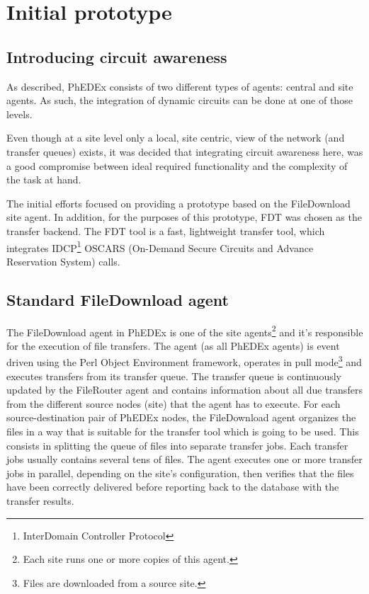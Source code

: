 \section{Initial prototype}

\subsection{Introducing circuit awareness}

As described, PhEDEx consists of two different types of agents: 
central and site agents. As such, the integration of dynamic circuits can 
be done at one of those levels.

Even though at a site level only a local, site centric, view of
the network (and transfer queues) exists, it was decided that integrating 
circuit awareness here, was a good compromise between ideal required 
functionality and the complexity of the task at hand.

The initial efforts\cite{ANSE-ISGC} focused on providing a prototype based on the FileDownload
site agent. In addition, for the purposes of this prototype, FDT\cite{FDT} was chosen
as the transfer backend. The FDT tool is a fast, lightweight transfer tool,
which integrates IDCP\footnote{InterDomain Controller Protocol} \cite{IDCP}
OSCARS\cite{OSCARS} (On-Demand Secure Circuits and Advance Reservation System) calls.

\subsection{Standard FileDownload agent}

The FileDownload agent in PhEDEx is one of the site agents\footnote{
Each site runs one or more copies of this agent.} and it's responsible for the
execution of file transfers. The agent (as all PhEDEx agents) is event driven 
using the Perl Object Environment framework, operates in pull mode\footnote{Files are
downloaded from a source site.} and executes transfers from its transfer queue.
The transfer queue is continuously updated by the FileRouter agent and contains 
information about all due transfers from the different source nodes (site) that the agent 
has to execute. For each source-destination pair of PhEDEx nodes, the FileDownload 
agent organizes the files in a way that is suitable for the transfer tool which is 
going to be used. This consists in splitting the queue of files into separate 
transfer jobs. Each transfer jobs usually contains several tens of files.
The agent executes one or more transfer jobs in parallel, depending 
on the site's configuration, then verifies that the files have been correctly 
delivered before reporting back to the database with the transfer results.

